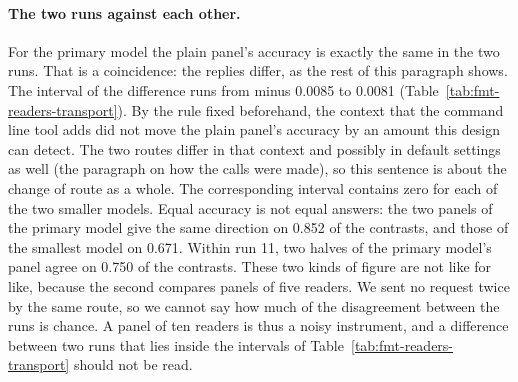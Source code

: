 \paragraph{The two runs against each other.} For the primary model the plain panel's accuracy is exactly the same in the two runs. That is a coincidence: the replies differ, as the rest of this paragraph shows. The interval of the difference runs from minus 0.0085 to 0.0081 (Table~\ref{tab:fmt-readers-transport}). By the rule fixed beforehand, the context that the command line tool adds did not move the plain panel's accuracy by an amount this design can detect. The two routes differ in that context and possibly in default settings as well (the paragraph on how the calls were made), so this sentence is about the change of route as a whole. The corresponding interval contains zero for each of the two smaller models. Equal accuracy is not equal answers: the two panels of the primary model give the same direction on 0.852 of the contrasts, and those of the smallest model on 0.671. Within run 11, two halves of the primary model's panel agree on 0.750 of the contrasts. These two kinds of figure are not like for like, because the second compares panels of five readers. We sent no request twice by the same route, so we cannot say how much of the disagreement between the runs is chance. A panel of ten readers is thus a noisy instrument, and a difference between two runs that lies inside the intervals of Table~\ref{tab:fmt-readers-transport} should not be read.

